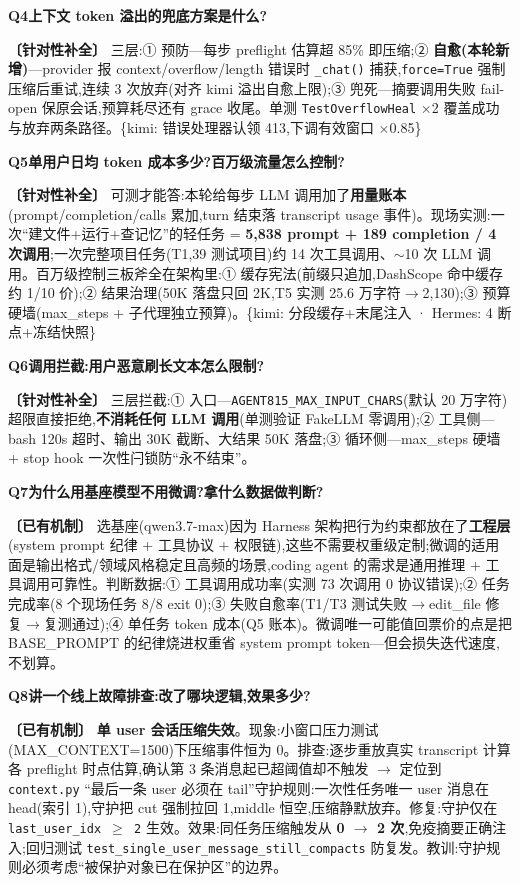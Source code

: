 \documentclass[10pt,a4paper]{article}
\renewcommand{\small}{\fontsize{8}{11.5}\selectfont}
\renewcommand{\footnotesize}{\fontsize{7.5}{10.5}\selectfont}
\newcommand{\taghave}{\textcolor{okc}{\textbf{〔已有机制〕}}}
\newcommand{\tagadded}{\textcolor{addc}{\textbf{〔针对性补全〕}}}
\newcommand{\tagref}[1]{\textcolor{dimc}{\footnotesize\{#1\}}}
\newcommand{\qhead}[2]{\par\vspace{7pt}\noindent
  \colorbox{acc}{\color{white}\bfseries\small #1}\hspace{4pt}\textbf{#2}\par\vspace{2pt}}
\newenvironment{qa}[2]{\qhead{#1}{#2}\small}{\par\vspace{2pt}}
\begin{document}
\begin{qa}{Q4}{上下文 token 溢出的兜底方案是什么?}
\tagadded{} 三层:① 预防---每步 preflight 估算超 85\% 即压缩;② \textbf{自愈(本轮新增)}---provider 报 context/overflow/length 错误时 \texttt{\_chat()} 捕获,\texttt{force=True} 强制压缩后重试,连续 3 次放弃(对齐 kimi 溢出自愈上限);③ 兜死---摘要调用失败 fail-open 保原会话,预算耗尽还有 grace 收尾。单测 \texttt{TestOverflowHeal} $\times$2 覆盖成功与放弃两条路径。\tagref{kimi: 错误处理器认领 413,下调有效窗口 $\times$0.85}
\end{qa}

\begin{qa}{Q5}{单用户日均 token 成本多少?百万级流量怎么控制?}
\tagadded{} 可测才能答:本轮给每步 LLM 调用加了\textbf{用量账本}(prompt/completion/calls 累加,turn 结束落 transcript usage 事件)。现场实测:一次``建文件+运行+查记忆''的轻任务 = \textbf{5,838 prompt + 189 completion / 4 次调用};一次完整项目任务(T1,39 测试项目)约 14 次工具调用、$\sim$10 次 LLM 调用。百万级控制三板斧全在架构里:① 缓存宪法(前缀只追加,DashScope 命中缓存约 1/10 价);② 结果治理(50K 落盘只回 2K,T5 实测 25.6 万字符$\to$2,130);③ 预算硬墙(max\_steps + 子代理独立预算)。\tagref{kimi: 分段缓存+末尾注入 · Hermes: 4 断点+冻结快照}
\end{qa}

\begin{qa}{Q6}{调用拦截:用户恶意刷长文本怎么限制?}
\tagadded{} 三层拦截:① 入口---\texttt{AGENT815\_MAX\_INPUT\_CHARS}(默认 20 万字符)超限直接拒绝,\textbf{不消耗任何 LLM 调用}(单测验证 FakeLLM 零调用);② 工具侧---bash 120s 超时、输出 30K 截断、大结果 50K 落盘;③ 循环侧---max\_steps 硬墙 + stop hook 一次性闩锁防``永不结束''。
\end{qa}

\begin{qa}{Q7}{为什么用基座模型不用微调?拿什么数据做判断?}
\taghave{} 选基座(qwen3.7-max)因为 Harness 架构把行为约束都放在了\textbf{工程层}(system prompt 纪律 + 工具协议 + 权限链),这些不需要权重级定制;微调的适用面是输出格式/领域风格稳定且高频的场景,coding agent 的需求是通用推理 + 工具调用可靠性。判断数据:① 工具调用成功率(实测 73 次调用 0 协议错误);② 任务完成率(8 个现场任务 8/8 exit 0);③ 失败自愈率(T1/T3 测试失败$\to$edit\_file 修复$\to$复测通过);④ 单任务 token 成本(Q5 账本)。微调唯一可能值回票价的点是把 BASE\_PROMPT 的纪律烧进权重省 system prompt token---但会损失迭代速度,不划算。
\end{qa}

\begin{qa}{Q8}{讲一个线上故障排查:改了哪块逻辑,效果多少?}
\taghave{} \textbf{单 user 会话压缩失效}。现象:小窗口压力测试(MAX\_CONTEXT=1500)下压缩事件恒为 0。排查:逐步重放真实 transcript 计算各 preflight 时点估算,确认第 3 条消息起已超阈值却不触发 $\to$ 定位到 \texttt{context.py} ``最后一条 user 必须在 tail''守护规则:一次性任务唯一 user 消息在 head(索引 1),守护把 cut 强制拉回 1,middle 恒空,压缩静默放弃。修复:守护仅在 \texttt{last\_user\_idx $\geq$ 2} 生效。效果:同任务压缩触发从 \textbf{0 $\to$ 2 次},免疫摘要正确注入;回归测试 \texttt{test\_single\_user\_message\_still\_compacts} 防复发。教训:守护规则必须考虑``被保护对象已在保护区''的边界。
\end{qa}
\end{document}
